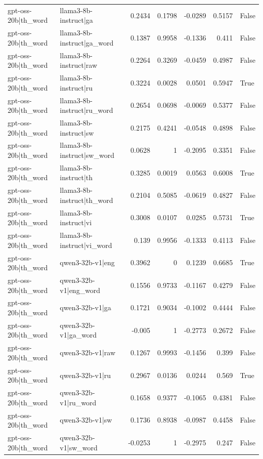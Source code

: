 \begin{table}
\begin{tabular}{l l r r r r l}
gpt-oss-20b|th_word & llama3-8b-instruct|ga & 0.2434 & 0.1798 & -0.0289 & 0.5157 & False \\
gpt-oss-20b|th_word & llama3-8b-instruct|ga_word & 0.1387 & 0.9958 & -0.1336 & 0.411 & False \\
gpt-oss-20b|th_word & llama3-8b-instruct|raw & 0.2264 & 0.3269 & -0.0459 & 0.4987 & False \\
gpt-oss-20b|th_word & llama3-8b-instruct|ru & 0.3224 & 0.0028 & 0.0501 & 0.5947 & True \\
gpt-oss-20b|th_word & llama3-8b-instruct|ru_word & 0.2654 & 0.0698 & -0.0069 & 0.5377 & False \\
gpt-oss-20b|th_word & llama3-8b-instruct|sw & 0.2175 & 0.4241 & -0.0548 & 0.4898 & False \\
gpt-oss-20b|th_word & llama3-8b-instruct|sw_word & 0.0628 & 1 & -0.2095 & 0.3351 & False \\
gpt-oss-20b|th_word & llama3-8b-instruct|th & 0.3285 & 0.0019 & 0.0563 & 0.6008 & True \\
gpt-oss-20b|th_word & llama3-8b-instruct|th_word & 0.2104 & 0.5085 & -0.0619 & 0.4827 & False \\
gpt-oss-20b|th_word & llama3-8b-instruct|vi & 0.3008 & 0.0107 & 0.0285 & 0.5731 & True \\
gpt-oss-20b|th_word & llama3-8b-instruct|vi_word & 0.139 & 0.9956 & -0.1333 & 0.4113 & False \\
gpt-oss-20b|th_word & qwen3-32b-v1|eng & 0.3962 & 0 & 0.1239 & 0.6685 & True \\
gpt-oss-20b|th_word & qwen3-32b-v1|eng_word & 0.1556 & 0.9733 & -0.1167 & 0.4279 & False \\
gpt-oss-20b|th_word & qwen3-32b-v1|ga & 0.1721 & 0.9034 & -0.1002 & 0.4444 & False \\
gpt-oss-20b|th_word & qwen3-32b-v1|ga_word & -0.005 & 1 & -0.2773 & 0.2672 & False \\
gpt-oss-20b|th_word & qwen3-32b-v1|raw & 0.1267 & 0.9993 & -0.1456 & 0.399 & False \\
gpt-oss-20b|th_word & qwen3-32b-v1|ru & 0.2967 & 0.0136 & 0.0244 & 0.569 & True \\
gpt-oss-20b|th_word & qwen3-32b-v1|ru_word & 0.1658 & 0.9377 & -0.1065 & 0.4381 & False \\
gpt-oss-20b|th_word & qwen3-32b-v1|sw & 0.1736 & 0.8938 & -0.0987 & 0.4458 & False \\
gpt-oss-20b|th_word & qwen3-32b-v1|sw_word & -0.0253 & 1 & -0.2975 & 0.247 & False \\

\end{tabular}
\end{table}
